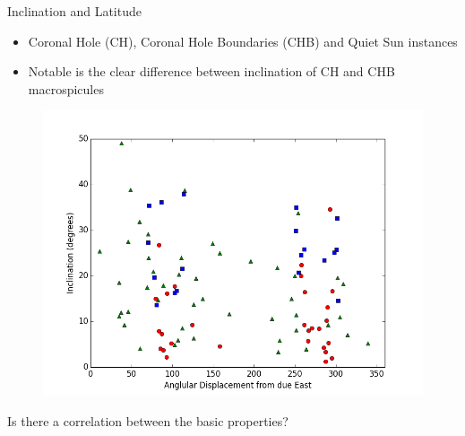 \documentclass{beamer}
\begin{document}
	\begin{frame}{Inclination and Latitude}
		\begin{itemize}
			\item{Coronal Hole (CH), Coronal Hole Boundaries (CHB) and Quiet Sun instances}
			\item{Notable is the clear difference between inclination of CH and CHB macrospicules}
		\end{itemize}
		\begin{figure}
			\centering
				\includegraphics[scale=0.25]{Figs/tilt_vs_lat.png}
		\end{figure}
	\end{frame}
	
	
	
	\begin{frame}
		\begin{center}
			Is there a correlation between the basic properties?			
		\end{center}

	\end{frame}
	
	
	
\end{document}
